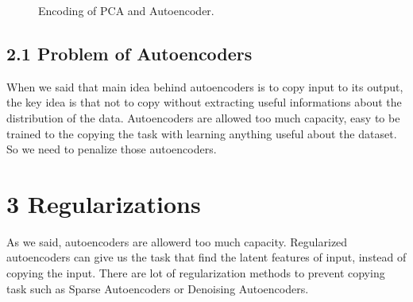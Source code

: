 \documentclass[11pt,twocolumn]{article}
\begin{document}
\begin{figure}
\centering
{}
\caption{Encoding of PCA and Autoencoder.}
\end{figure}
\subsection{2.1 Problem of Autoencoders}
When we said that main idea behind autoencoders is to copy input to its output, the key idea is that not to copy without extracting useful informations about the distribution of the data. Autoencoders are allowed too much capacity, easy to be trained to the copying the task with learning anything useful about the dataset. So we need to penalize those autoencoders.

\section{3 Regularizations}
As we said, autoencoders are allowerd too much capacity. Regularized autoencoders can give us the task that find the latent features of input, instead of copying the input. There are lot of regularization methods to prevent copying task such as Sparse Autoencoders or Denoising Autoencoders. 
\end{document}
